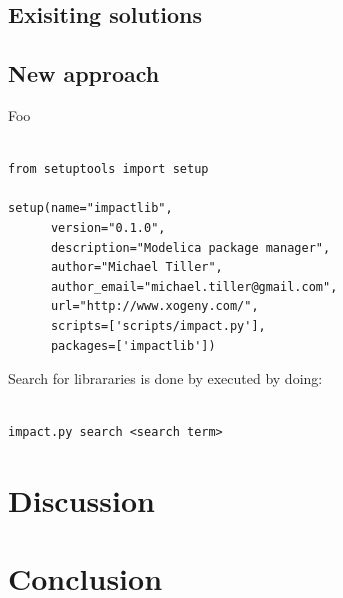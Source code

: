 \documentclass[11pt,a4paper,twocolumn]{article}
\begin{document}
\subsection{Exisiting solutions}
\label{sec:exist-sol}

\subsection{New approach}
\label{sec:exist-sol}
Foo
\lstset{language=python}
\begin{lstlisting}[frame=single]  % Start your code-block

from setuptools import setup

setup(name="impactlib",
      version="0.1.0",
      description="Modelica package manager",
      author="Michael Tiller",
      author_email="michael.tiller@gmail.com",
      url="http://www.xogeny.com/",
      scripts=['scripts/impact.py'],
      packages=['impactlib'])
\end{lstlisting}


Search for librararies is done by executed by doing:
\lstset{language=bash}
\begin{lstlisting}[frame=shadowbox]  % Start your code-block

impact.py search <search term>
\end{lstlisting}

\section{Discussion}
\label{sec:discussion}

\section{Conclusion}
\label{sec:conclusion}


\end{document}
